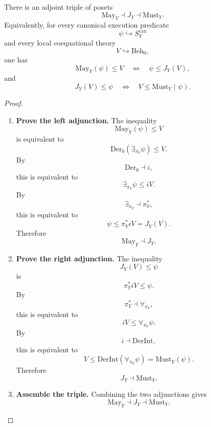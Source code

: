 \begin{theorem}
\label{thm:may-must-coequational-approximation}
There is an adjoint triple of posets
\[
  \mathrm{May}_Y
  \dashv
  J_Y
  \dashv
  \mathrm{Must}_Y.
\]
Equivalently, for every canonical execution predicate
\[
  \psi\hookrightarrow S^{\mathrm{can}}_Y
\]
and every local coequational theory
\[
  V\hookrightarrow \mathrm{Beh}_0,
\]
one has
\[
  \mathrm{May}_Y(\psi)\leq V
  \quad\Longleftrightarrow\quad
  \psi\leq J_Y(V),
\]
and
\[
  J_Y(V)\leq\psi
  \quad\Longleftrightarrow\quad
  V\leq \mathrm{Must}_Y(\psi).
\]
\end{theorem}

\begin{proof}
\leavevmode
\begin{enumerate}
  \item \textbf{Prove the left adjunction.}
  The inequality
  \[
    \mathrm{May}_Y(\psi)\leq V
  \]
  is equivalent to
  \[
    \mathrm{Der}_0(\exists_{\pi_Y}\psi)\leq V.
  \]
  By
  \[
    \mathrm{Der}_0\dashv i,
  \]
  this is equivalent to
  \[
    \exists_{\pi_Y}\psi\leq iV.
  \]
  By
  \[
    \exists_{\pi_Y}\dashv \pi_Y^*,
  \]
  this is equivalent to
  \[
    \psi\leq \pi_Y^*iV=J_Y(V).
  \]
  Therefore
  \[
    \mathrm{May}_Y\dashv J_Y.
  \]

  \item \textbf{Prove the right adjunction.}
  The inequality
  \[
    J_Y(V)\leq\psi
  \]
  is
  \[
    \pi_Y^*iV\leq\psi.
  \]
  By
  \[
    \pi_Y^*\dashv\forall_{\pi_Y},
  \]
  this is equivalent to
  \[
    iV\leq\forall_{\pi_Y}\psi.
  \]
  By
  \[
    i\dashv\mathrm{DerInt},
  \]
  this is equivalent to
  \[
    V\leq \mathrm{DerInt}(\forall_{\pi_Y}\psi)
    =
    \mathrm{Must}_Y(\psi).
  \]
  Therefore
  \[
    J_Y\dashv\mathrm{Must}_Y.
  \]

  \item \textbf{Assemble the triple.}
  Combining the two adjunctions gives
  \[
    \mathrm{May}_Y
    \dashv
    J_Y
    \dashv
    \mathrm{Must}_Y.
  \]
\end{enumerate}
\end{proof}

